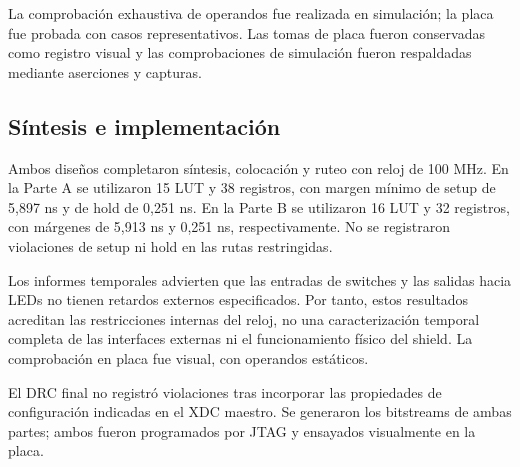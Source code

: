 La comprobación exhaustiva de operandos fue realizada en simulación; la placa fue probada con casos representativos. Las tomas de placa fueron conservadas como registro visual y las comprobaciones de simulación fueron respaldadas mediante aserciones y capturas.


\subsection{Síntesis e implementación}
Ambos diseños completaron síntesis, colocación y ruteo con reloj de 100 MHz. En la Parte A se utilizaron 15 LUT y 38 registros, con margen mínimo de setup de 5,897 ns y de hold de 0,251 ns. En la Parte B se utilizaron 16 LUT y 32 registros, con márgenes de 5,913 ns y 0,251 ns, respectivamente. No se registraron violaciones de setup ni hold en las rutas restringidas.

Los informes temporales advierten que las entradas de switches y las salidas hacia LEDs no tienen retardos externos especificados. Por tanto, estos resultados acreditan las restricciones internas del reloj, no una caracterización temporal completa de las interfaces externas ni el funcionamiento físico del shield. La comprobación en placa fue visual, con operandos estáticos.

El DRC final no registró violaciones tras incorporar las propiedades de configuración indicadas en el XDC maestro. Se generaron los bitstreams de ambas partes; ambos fueron programados por JTAG y ensayados visualmente en la placa.

